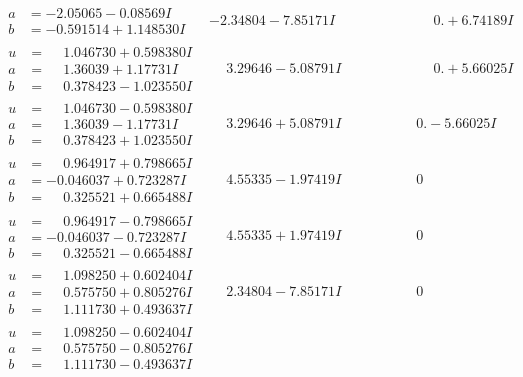 \documentclass[1p]{elsarticle_modified}
\theoremstyle{definition}
\begin{document}
$$\begin{array}{c|c|c}
\begin{aligned}
a &= -2.05065 - 0.08569 I \\
b &= -0.591514 + 1.148530 I\end{aligned}
 & -2.34804 - 7.85171 I & \phantom{-0.000000 -}0. + 6.74189 I \\ \hline\begin{aligned}
u &= \phantom{-}1.046730 + 0.598380 I \\
a &= \phantom{-}1.36039 + 1.17731 I \\
b &= \phantom{-}0.378423 - 1.023550 I\end{aligned}
 & \phantom{-}3.29646 - 5.08791 I & \phantom{-0.000000 -}0. + 5.66025 I \\ \hline\begin{aligned}
u &= \phantom{-}1.046730 - 0.598380 I \\
a &= \phantom{-}1.36039 - 1.17731 I \\
b &= \phantom{-}0.378423 + 1.023550 I\end{aligned}
 & \phantom{-}3.29646 + 5.08791 I & \phantom{-0.000000 } 0. - 5.66025 I \\ \hline\begin{aligned}
u &= \phantom{-}0.964917 + 0.798665 I \\
a &= -0.046037 + 0.723287 I \\
b &= \phantom{-}0.325521 + 0.665488 I\end{aligned}
 & \phantom{-}4.55335 - 1.97419 I & \phantom{-0.000000 } 0 \\ \hline\begin{aligned}
u &= \phantom{-}0.964917 - 0.798665 I \\
a &= -0.046037 - 0.723287 I \\
b &= \phantom{-}0.325521 - 0.665488 I\end{aligned}
 & \phantom{-}4.55335 + 1.97419 I & \phantom{-0.000000 } 0 \\ \hline\begin{aligned}
u &= \phantom{-}1.098250 + 0.602404 I \\
a &= \phantom{-}0.575750 + 0.805276 I \\
b &= \phantom{-}1.111730 + 0.493637 I\end{aligned}
 & \phantom{-}2.34804 - 7.85171 I & \phantom{-0.000000 } 0 \\ \hline\begin{aligned}
u &= \phantom{-}1.098250 - 0.602404 I \\
a &= \phantom{-}0.575750 - 0.805276 I \\
b &= \phantom{-}1.111730 - 0.493637 I\end{aligned}

\end{array}$$
\end{document}
